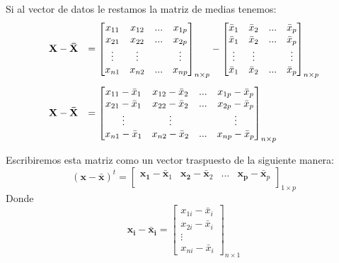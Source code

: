 \documentclass[12pt,letterpaper]{report} %
\begin{document}
Si al vector de datos le restamos la matriz de medias tenemos:
$$
\begin{array}{rl}\vspace{3 mm}
\mathbf{X-\bar{X}} & = \begin{bmatrix}
x_{11} & x_{12} & ... & x_{1p} \\
x_{21} & x_{22} & ... & x_{2p} \\
\vdots & \vdots &   & \vdots \\
x_{n1} & x_{n2} & ... & x_{np}
\end{bmatrix}_{n\times p}
-
\begin{bmatrix}
\bar{x}_{1} & \bar{x}_{2} & ... & \bar{x}_{p} \\
\bar{x}_{1} & \bar{x}_{2} & ... & \bar{x}_{p} \\
\vdots & \vdots &   & \vdots \\
\bar{x}_{1} & \bar{x}_{2} & ... & \bar{x}_{p} 
\end{bmatrix}_{n\times p} \\
\mathbf{X-\bar{X}} & = \begin{bmatrix}
x_{11}-\bar{x}_{1} & x_{12}-\bar{x}_{2} & ... & x_{1p}-\bar{x}_{p} \\ 
x_{21}-\bar{x}_{1} & x_{22}-\bar{x}_{2} & ... & x_{2p}-\bar{x}_{p} \\
\vdots & \vdots &   & \vdots \\
x_{n1}-\bar{x}_{1} & x_{n2}-\bar{x}_{2} & ... & x_{np}-\bar{x}_{p}
\end{bmatrix}_{n\times p}
\end{array}
$$

Escribiremos esta matriz como un vector traspuesto de la siguiente manera:
$$
(\mathbf{x-\bar{x}})^t = \begin{bmatrix}
\mathbf{x_{1}}-\bar{\mathbf{x}}_{1} & \mathbf{x_{2}}-\bar{\mathbf{x}}_{2} & ... & \mathbf{x_{p}}-\bar{\mathbf{x}}_{p} \\
\end{bmatrix}_{1\times p}
$$
Donde 
$$
\mathbf{x_{i}}-\mathbf{\bar{x}_{i}} = \begin{bmatrix}
x_{1i}-\bar{x}_{i}\\
x_{2i}-\bar{x}_{i}\\
\vdots\\
x_{ni}-\bar{x}_{i}
\end{bmatrix}_{n\times 1}
$$
\end{document}
